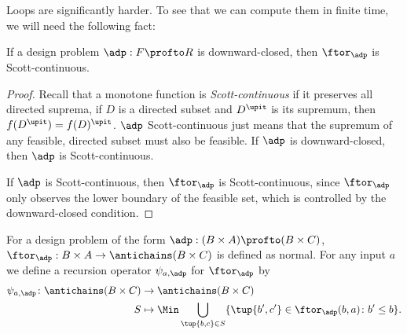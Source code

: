 Loops are significantly harder.
To see that we can compute them in finite time, we will need the following fact:
\begin{lemma}
	If a design problem $\adp : F \profto R$ is downward-closed, then $\ftor_\adp$ is Scott-continuous.
\end{lemma}

\begin{proof}
	Recall that a monotone function is \emph{Scott-continuous} if it preserves all directed suprema, \ie  if $D$ is a directed subset and $D^\upit$ is its supremum, then $f(D^\upit) = f(D)^\upit$.
	$\adp$ Scott-continuous just means that the supremum of any feasible, directed subset must also be feasible.
	If $\adp$ is downward-closed, then $\adp$ is Scott-continuous.


	If $\adp$ is Scott-continuous, then $\ftor_\adp$ is Scott-continuous, since $\ftor_\adp$ only observes the lower boundary of the feasible set, which is controlled by the downward-closed condition.
\end{proof}

For a design problem of the form $\adp : (B \times A) \profto (B \times C)$, $\ftor_\adp : B \times A \to \antichains (B \times C)$ is defined as normal.
For any input $a$ we define a recursion operator $\psi_{a,\adp}$ for $\ftor_\adp$ by
\begin{equation}
	\begin{aligned}
		\psi_{a,\adp} \colon \antichains (B \times C) & \to \antichains (B \times C)                                                                   \\
		S                                             & \mapsto \Min \bigcup_{\tup{b,c} \in S} \{ \tup{b',c'} \in \ftor_\adp(b,a) \colon b' \leq b \}.
	\end{aligned}
\end{equation}

